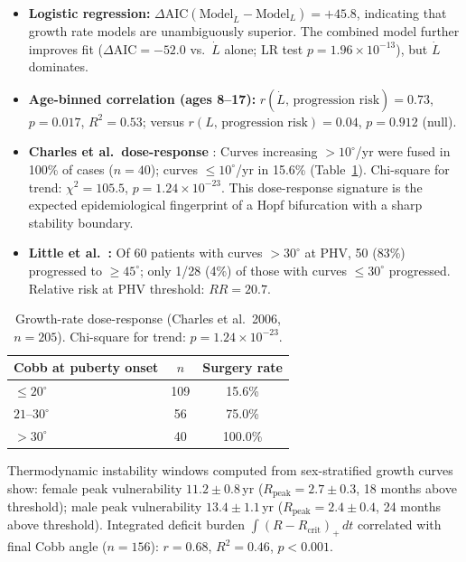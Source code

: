 \documentclass[12pt, letterpaper]{article}
\newcommand{\DAIC}{\Delta\mathrm{AIC}}
\begin{document}
\begin{itemize}
  \item \textbf{Logistic regression:} $\DAIC(\text{Model}_{\dot{L}}
    - \text{Model}_{L}) = +45.8$, indicating that growth rate models are
    unambiguously superior. The combined model further improves fit
    ($\DAIC = -52.0$ vs.\ $\dot{L}$ alone; LR test $p = 1.96 \times 10^{-13}$),
    but $\dot{L}$ dominates.

  \item \textbf{Age-binned correlation (ages 8--17):} $r(\dot{L},\,\text{progression risk}) = 0.73$, $p = 0.017$, $R^{2} = 0.53$;
    versus $r(L,\,\text{progression risk}) = 0.04$, $p = 0.912$ (null).

  \item \textbf{Charles et al.\ dose-response} \citep{Charles2006}: Curves
    increasing $>10^{\circ}$/yr were fused in 100\% of cases ($n=40$); curves
    $\leq 10^{\circ}$/yr in 15.6\% (Table~\ref{tab:charles}).
    Chi-square for trend: $\chi^{2} = 105.5$, $p = 1.24 \times 10^{-23}$.
    This dose-response signature is the expected epidemiological fingerprint
    of a Hopf bifurcation with a sharp stability boundary.

  \item \textbf{Little et al.\ \citep{Little2000}:} Of 60 patients with curves
    $>30^{\circ}$ at PHV, 50 (83\%) progressed to $\geq 45^{\circ}$; only 1/28
    (4\%) of those with curves $\leq 30^{\circ}$ progressed. Relative risk at
    PHV threshold: $RR = 20.7$.
\end{itemize}

\begin{table}[H]
  \centering
  \caption{Growth-rate dose-response (Charles et al.\ 2006, $n=205$).
    Chi-square for trend: $p = 1.24\times10^{-23}$.}
  \label{tab:charles}
  \renewcommand{\arraystretch}{1.3}
  \begin{tabular}{lcc}
    \toprule
    Cobb at puberty onset & $n$ & Surgery rate \\
    \midrule
    $\leq 20^{\circ}$ & 109 & 15.6\% \\
    $21$--$30^{\circ}$ & 56 & 75.0\% \\
    $>30^{\circ}$ & 40 & 100.0\% \\
    \bottomrule
  \end{tabular}
\end{table}

Thermodynamic instability windows computed from sex-stratified growth curves show:
female peak vulnerability $11.2 \pm 0.8$\,yr ($R_{\mathrm{peak}} = 2.7 \pm 0.3$,
18 months above threshold); male peak vulnerability $13.4 \pm 1.1$\,yr
($R_{\mathrm{peak}} = 2.4 \pm 0.4$, 24 months above threshold).
Integrated deficit burden $\int(R - R_{\mathrm{crit}})_+\,dt$ correlated with
final Cobb angle ($n=156$): $r = 0.68$, $R^{2} = 0.46$, $p < 0.001$.
\end{document}
